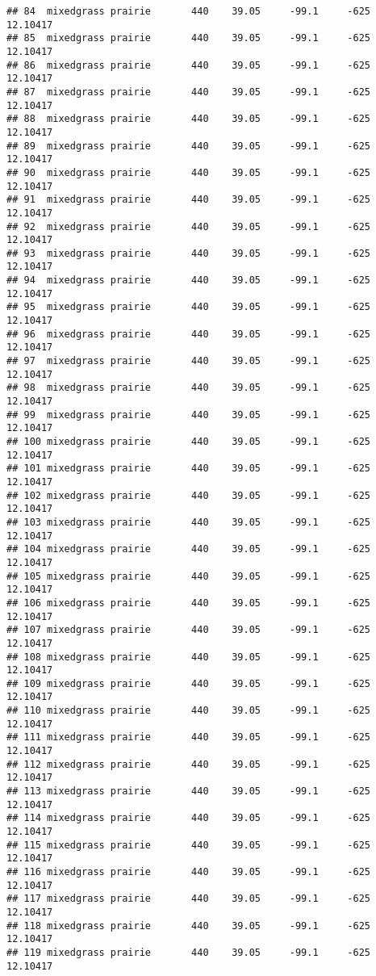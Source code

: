 \documentclass[]{article}
\begin{document}
\begin{verbatim}
## 84  mixedgrass prairie       440    39.05     -99.1     -625 12.10417
## 85  mixedgrass prairie       440    39.05     -99.1     -625 12.10417
## 86  mixedgrass prairie       440    39.05     -99.1     -625 12.10417
## 87  mixedgrass prairie       440    39.05     -99.1     -625 12.10417
## 88  mixedgrass prairie       440    39.05     -99.1     -625 12.10417
## 89  mixedgrass prairie       440    39.05     -99.1     -625 12.10417
## 90  mixedgrass prairie       440    39.05     -99.1     -625 12.10417
## 91  mixedgrass prairie       440    39.05     -99.1     -625 12.10417
## 92  mixedgrass prairie       440    39.05     -99.1     -625 12.10417
## 93  mixedgrass prairie       440    39.05     -99.1     -625 12.10417
## 94  mixedgrass prairie       440    39.05     -99.1     -625 12.10417
## 95  mixedgrass prairie       440    39.05     -99.1     -625 12.10417
## 96  mixedgrass prairie       440    39.05     -99.1     -625 12.10417
## 97  mixedgrass prairie       440    39.05     -99.1     -625 12.10417
## 98  mixedgrass prairie       440    39.05     -99.1     -625 12.10417
## 99  mixedgrass prairie       440    39.05     -99.1     -625 12.10417
## 100 mixedgrass prairie       440    39.05     -99.1     -625 12.10417
## 101 mixedgrass prairie       440    39.05     -99.1     -625 12.10417
## 102 mixedgrass prairie       440    39.05     -99.1     -625 12.10417
## 103 mixedgrass prairie       440    39.05     -99.1     -625 12.10417
## 104 mixedgrass prairie       440    39.05     -99.1     -625 12.10417
## 105 mixedgrass prairie       440    39.05     -99.1     -625 12.10417
## 106 mixedgrass prairie       440    39.05     -99.1     -625 12.10417
## 107 mixedgrass prairie       440    39.05     -99.1     -625 12.10417
## 108 mixedgrass prairie       440    39.05     -99.1     -625 12.10417
## 109 mixedgrass prairie       440    39.05     -99.1     -625 12.10417
## 110 mixedgrass prairie       440    39.05     -99.1     -625 12.10417
## 111 mixedgrass prairie       440    39.05     -99.1     -625 12.10417
## 112 mixedgrass prairie       440    39.05     -99.1     -625 12.10417
## 113 mixedgrass prairie       440    39.05     -99.1     -625 12.10417
## 114 mixedgrass prairie       440    39.05     -99.1     -625 12.10417
## 115 mixedgrass prairie       440    39.05     -99.1     -625 12.10417
## 116 mixedgrass prairie       440    39.05     -99.1     -625 12.10417
## 117 mixedgrass prairie       440    39.05     -99.1     -625 12.10417
## 118 mixedgrass prairie       440    39.05     -99.1     -625 12.10417
## 119 mixedgrass prairie       440    39.05     -99.1     -625 12.10417

\end{verbatim}
\end{document}
